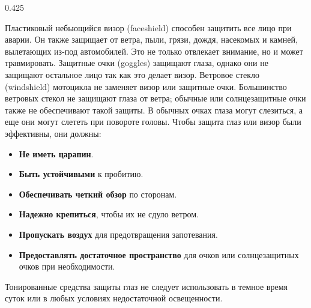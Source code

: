 \begin{langblock}{0.425}
\begin{eng}
	\end{eng}
	\begin{rus}
		Пластиковый небьющийся визор (faceshield) способен защитить все лицо при аварии. Он также защищает от ветра, пыли, грязи, дождя, насекомых и камней, вылетающих из-под автомобилей. Это не только отвлекает внимание, но и может травмировать. Защитные очки (goggles) защищают глаза, однако они не защищают остальное лицо так как это делает визор. Ветровое стекло (windshield) мотоцикла не заменяет визор или защитные очки. Большинство ветровых стекол не защищают глаза от ветра; обычные или солнцезащитные очки также не обеспечивают такой защиты. В обычных очках глаза могут слезиться, а еще они могут слететь при повороте головы. Чтобы защита глаз или визор были эффективны, они должны:
		\begin{itemize}[noitemsep]
			\item \textbf{Не иметь царапин}.
			\item \textbf{Быть устойчивыми} к пробитию.
			\item \textbf{Обеспечивать четкий обзор} по сторонам.
			\item \textbf{Надежно крепиться}, чтобы их не сдуло ветром.
			\item \textbf{Пропускать воздух} для предотвращения запотевания.
			\item \textbf{Предоставлять достаточное пространство} для очков или солнцезащитных очков при необходимости.
		\end{itemize}
		Тонированные средства защиты глаз не следует использовать в темное время суток или в любых условиях недостаточной освещенности.
	\end{rus}
\end{langblock}


